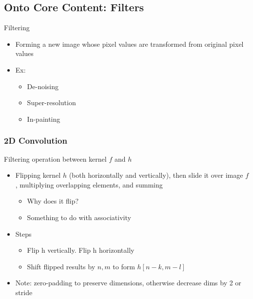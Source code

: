 \subsection{Onto Core Content: Filters}
Filtering
\begin{itemize}
    \item Forming a new image whose pixel values are transformed from original pixel values
    \item Ex:
    \begin{itemize}
        \item De-noising
        \item Super-resolution
        \item In-painting
    \end{itemize}
\end{itemize}
\subsubsection{2D Convolution}
Filtering operation between kernel $f$ and $h$
\begin{itemize}
    \item Flipping kernel $h$ (both horizontally and vertically), then slide it over image $f$, multiplying overlapping elements, and summing
    \begin{itemize}
        \item Why does it flip?
        \item Something to do with associativity
    \end{itemize}
    \item Steps
    \begin{itemize}
        \item Flip h vertically. Flip h horizontally
        \item Shift flipped results by $n,m$ to form $h[n-k,m-l]$
    \end{itemize}
    \item Note: zero-padding to preserve dimensions, otherwise decrease dims by 2 or stride
\end{itemize}